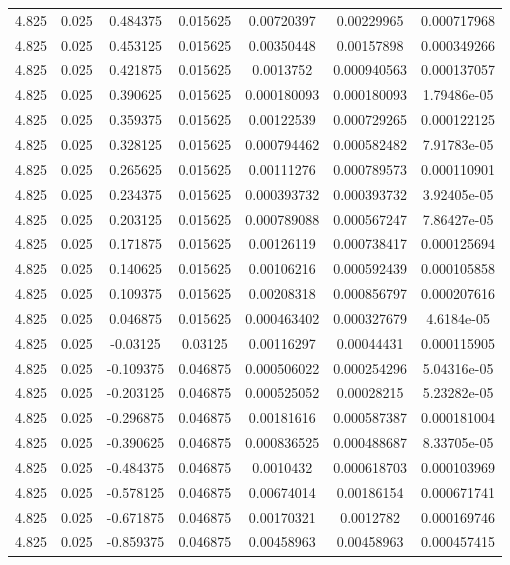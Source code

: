 \begin{flushleft}
\begin{longtable}{ccccccc}
4.825 & 0.025 & 0.484375 & 0.015625 & 0.00720397 & 0.00229965 & 0.000717968  \\ 
4.825 & 0.025 & 0.453125 & 0.015625 & 0.00350448 & 0.00157898 & 0.000349266  \\ 
4.825 & 0.025 & 0.421875 & 0.015625 & 0.0013752 & 0.000940563 & 0.000137057  \\ 
4.825 & 0.025 & 0.390625 & 0.015625 & 0.000180093 & 0.000180093 & 1.79486e-05  \\ 
4.825 & 0.025 & 0.359375 & 0.015625 & 0.00122539 & 0.000729265 & 0.000122125  \\ 
4.825 & 0.025 & 0.328125 & 0.015625 & 0.000794462 & 0.000582482 & 7.91783e-05  \\ 
4.825 & 0.025 & 0.265625 & 0.015625 & 0.00111276 & 0.000789573 & 0.000110901  \\ 
4.825 & 0.025 & 0.234375 & 0.015625 & 0.000393732 & 0.000393732 & 3.92405e-05  \\ 
4.825 & 0.025 & 0.203125 & 0.015625 & 0.000789088 & 0.000567247 & 7.86427e-05  \\ 
4.825 & 0.025 & 0.171875 & 0.015625 & 0.00126119 & 0.000738417 & 0.000125694  \\ 
4.825 & 0.025 & 0.140625 & 0.015625 & 0.00106216 & 0.000592439 & 0.000105858  \\ 
4.825 & 0.025 & 0.109375 & 0.015625 & 0.00208318 & 0.000856797 & 0.000207616  \\ 
4.825 & 0.025 & 0.046875 & 0.015625 & 0.000463402 & 0.000327679 & 4.6184e-05  \\ 
4.825 & 0.025 & -0.03125 & 0.03125 & 0.00116297 & 0.00044431 & 0.000115905  \\ 
4.825 & 0.025 & -0.109375 & 0.046875 & 0.000506022 & 0.000254296 & 5.04316e-05  \\ 
4.825 & 0.025 & -0.203125 & 0.046875 & 0.000525052 & 0.00028215 & 5.23282e-05  \\ 
4.825 & 0.025 & -0.296875 & 0.046875 & 0.00181616 & 0.000587387 & 0.000181004  \\ 
4.825 & 0.025 & -0.390625 & 0.046875 & 0.000836525 & 0.000488687 & 8.33705e-05  \\ 
4.825 & 0.025 & -0.484375 & 0.046875 & 0.0010432 & 0.000618703 & 0.000103969  \\ 
4.825 & 0.025 & -0.578125 & 0.046875 & 0.00674014 & 0.00186154 & 0.000671741  \\ 
4.825 & 0.025 & -0.671875 & 0.046875 & 0.00170321 & 0.0012782 & 0.000169746  \\ 
4.825 & 0.025 & -0.859375 & 0.046875 & 0.00458963 & 0.00458963 & 0.000457415  \\ 

\end{longtable}
\end{flushleft}
